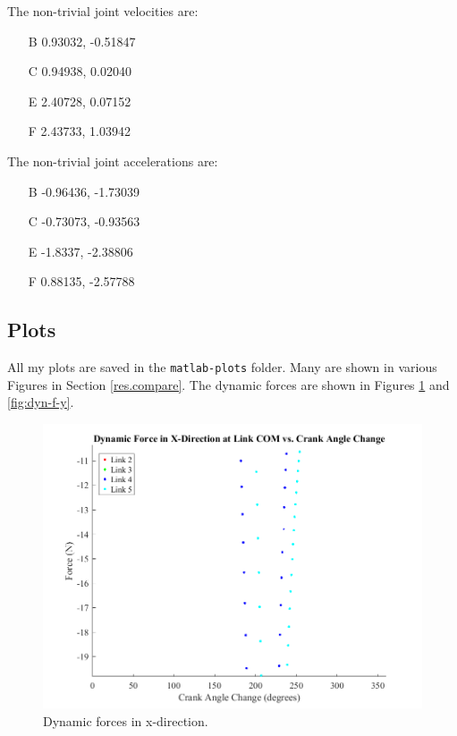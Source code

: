 \documentclass[12pt]{article}
\begin{document}
The non-trivial joint velocities are:
\begin{enumerate}
        \item[B] 0.93032, -0.51847
        \item[C] 0.94938,  0.02040
        \item[E] 2.40728,  0.07152
        \item[F] 2.43733,  1.03942
\end{enumerate}

The non-trivial joint accelerations are:
\begin{enumerate}
        \item[B] -0.96436, -1.73039
        \item[C] -0.73073, -0.93563
        \item[E] -1.8337, -2.38806
        \item[F] 0.88135, -2.57788
\end{enumerate}

\subsection{Plots}%
\label{res.plots}

All my plots are saved in the \texttt{matlab-plots} folder. Many are shown in various Figures in Section \ref{res.compare}. The dynamic forces are shown in Figures \ref{fig:dyn-f-x} and \ref{fig:dyn-f-y}.

\begin{figure}[H]
  \centering
  \includegraphics[scale=0.6]{../matlab-plots/dynamicForcesX.png}
  \caption{\label{fig:dyn-f-x}Dynamic forces in x-direction.}
\end{figure}
\end{document}
